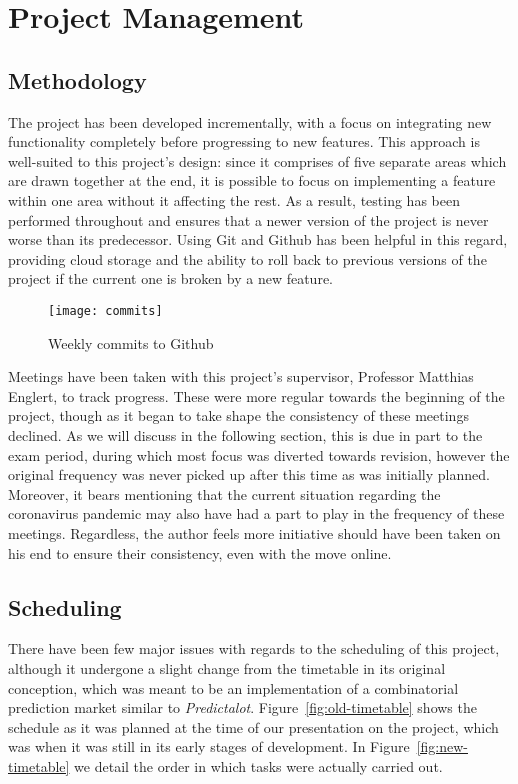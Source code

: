 \section{Project Management}

\label{sec:projectManagement}

\subsection{Methodology}

The project has been developed incrementally, with a focus on integrating new
functionality completely before progressing to new features. This approach is
well-suited to this project's design: since it comprises of five separate areas
which are drawn together at the end, it is possible to focus on implementing a
feature within one area without it affecting the rest. As a result, testing has
been performed throughout and ensures that a newer version of the project is
never worse than its predecessor. Using Git and Github has been helpful in this
regard, providing cloud storage and the ability to roll back to previous
versions of the project if the current one is broken by a new feature.

\begin{figure}[h]
	\centering
	\texttt{[image: commits]}
	\caption{Weekly commits to Github}
	\label{fig:commits}
\end{figure}

Meetings have been taken with this project's supervisor, Professor Matthias
Englert, to track progress. These were more regular towards the beginning of
the project, though as it began to take shape the consistency of these meetings
declined. As we will discuss in the following section, this is due in part to
the exam period, during which most focus was diverted towards revision, however
the original frequency was never picked up after this time as was initially
planned. Moreover, it bears mentioning that the current situation regarding the
coronavirus pandemic may also have had a part to play in the frequency of these
meetings. Regardless, the author feels more initiative should have been taken
on his end to ensure their consistency, even with the move online.

\subsection{Scheduling}

There have been few major issues with regards to the scheduling of this
project, although it undergone a slight change from the timetable in its
original conception, which was meant to be an implementation of a combinatorial
prediction market similar to \emph{Predictalot}. Figure~\ref{fig:old-timetable}
shows the schedule as it was planned at the time of our presentation on the
project, which was when it was still in its early stages of development. In
Figure~\ref{fig:new-timetable} we detail the order in which tasks were actually
carried out.

